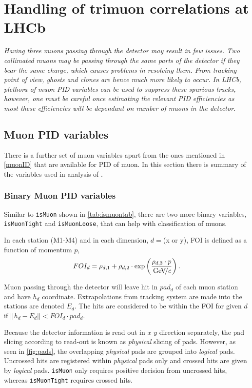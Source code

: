 \chapter{Handling of trimuon correlations at LHCb}
\label{chap:trimuon}

\textit{Having three muons passing through the detector may result in few issues. Two collimated muons may be passing through the same parts of the detector if they bear the same charge, which causes problems in resolving them. From tracking point of view, ghosts and clones are hence much more likely to occur. In LHCb, plethora of muon \Gls{PID} variables can be used to suppress these spurious tracks, however, one must be careful once estimating the relevant \gls{PID} efficiencies as most these efficiencies will be dependant on number of muons in the detector.}

\section{Muon PID variables}
There is a further set of muon variables apart from the ones mentioned in \autoref{muonID} that are available for \gls{PID} of muon. In this section there is summary of the variables used in analysis of \Bmumumu.

\subsection{Binary Muon PID variables}
Similar to \texttt{isMuon} shown in \autoref{tab:ismuontab},  there are two more binary variables, \texttt{isMuonTight} and \texttt{isMuonLoose}, that can help with classification of muons. 

In each station (M1-M4) and in each dimension, $d=$(x or y), \gls{FOI} is defined as a function of momentum $p$,
\begin{equation}
	FOI_{d}=\rho_{d,1}+\rho_{d,2}\cdot \exp \left(\frac{\rho_{d,3}\cdot p}{{\mathrm{\,Ge\kern -0.1em V\!/}c}} \right).
\end{equation}

Muon passing through the detector will leave hit in $pad_{d}$ of each muon station and have $h_{d}$ coordinate. Extrapolations from tracking system are made into the stations are denoted $E_{d}$. The hits are considered to be within the \gls{FOI} for given $d$ if $|| h_{d} - E_{d} || < FOI_{d} \cdot pad_{d}$. 

Because the detector information is read out in $x$ $y$ direction separately, the pad slicing according to read-out is known as \textit{physical} slicing of pads. However, as seen in \autoref{fig:pads}, the overlapping \textit{physical} pads are grouped into \textit{logical} pads. Uncrossed hits are registered within \textit{physical} pads only and crossed hits are given by \textit{logical} pads. \texttt{isMuon} only requires positive decision from uncrossed hits, whereas \texttt{isMuonTight} requires crossed hits. 


